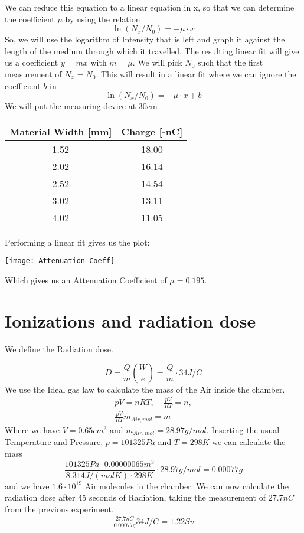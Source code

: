 \documentclass[]{scrartcl}
\begin{document}
We can reduce this equation to a linear equation in x, so that we can determine the coefficient $\mu$ by using the relation
\begin{equation}
	\ln(N_x/N_0) = -\mu\cdot x
\end{equation}
So, we will use the logarithm of Intensity that is left and graph it against the length of the medium through which it travelled. The resulting linear fit will give us a coefficient $y = mx$ with $m=\mu$. We will pick $N_0$ such that the first measurement of $N_x = N_0$. This will result in a linear fit where we can ignore the coefficient $b$ in
\begin{equation}
	\ln(N_x/N_0) = -\mu\cdot x + b
\end{equation}
We will put the measuring device at 30cm
\begin{center}
\begin{tabular}{|c|c|}
\hline
	Material Width [mm] & Charge [-nC]\\
	\hline
1.52 &  18.00\\
2.02 &  16.14\\
2.52 &  14.54\\
3.02 &  13.11\\
4.02 &  11.05\\
\hline
\end{tabular}
\end{center}
Performing a linear fit gives us the plot:

\begin{centering}
	\texttt{[image: Attenuation Coeff]}
\end{centering}

Which gives us an Attenuation Coefficient of $\mu = 0.195$.
\newpage
\section{Ionizations and radiation dose}

We define the Radiation dose.

\begin{equation}
	D = \frac{Q}{m}\left(\frac{W}{e}\right) = \frac{Q}{m}\cdot 34 J/C
\end{equation}
We use the Ideal gas law to calculate the mass of the Air inside the chamber.
\begin{gather}
	pV = nRT,\;\;\;\; \frac{pV}{RT} = n,\\
	\frac{pV}{RT}m_{Air,mol} = m
\end{gather}
Where we have $V=0.65cm^3$ and $m_{Air,mol} = 28.97 g/mol$. Inserting the usual Temperature and Pressure, $p= 101325 Pa$ and $T = 298K$ we can calculate the mass
\begin{equation}
	\frac{101325 Pa \cdot 0.00000065 m^3}{8.314 J/(mol K) \cdot 298K} \cdot 28.97 g/mol = 0.00077g
\end{equation}
and we have $1.6\cdot 10^{19}$ Air molecules in the chamber. We can now calculate the radiation dose after 45 seconds of Radiation, taking the measurement of $27.7nC$ from the previous experiment.
\begin{gather}
	\frac{27.7nC}{0.00077g}34 J/C = 1.22Sv
\end{gather}
\end{document}
